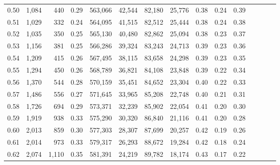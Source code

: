 \begin{tabular}{rrrcrrrrrrrrrrr}
0.50 &   1,084 &    440 &                                       0.29 &  563,066 &   42,544 &   82,180 &   25,776 &  0.38 &  0.24 &                         0.39 \\
0.51 &   1,029 &    332 &                                       0.24 &  564,095 &   41,515 &   82,512 &   25,444 &  0.38 &  0.24 &                         0.38 \\
0.52 &   1,035 &    350 &                                       0.25 &  565,130 &   40,480 &   82,862 &   25,094 &  0.38 &  0.23 &                         0.37 \\
0.53 &   1,156 &    381 &                                       0.25 &  566,286 &   39,324 &   83,243 &   24,713 &  0.39 &  0.23 &                         0.36 \\
0.54 &   1,209 &    415 &                                       0.26 &  567,495 &   38,115 &   83,658 &   24,298 &  0.39 &  0.23 &                         0.35 \\
0.55 &   1,294 &    450 &                                       0.26 &  568,789 &   36,821 &   84,108 &   23,848 &  0.39 &  0.22 &                         0.34 \\
0.56 &   1,370 &    544 &                                       0.28 &  570,159 &   35,451 &   84,652 &   23,304 &  0.40 &  0.22 &                         0.33 \\
0.57 &   1,486 &    556 &                                       0.27 &  571,645 &   33,965 &   85,208 &   22,748 &  0.40 &  0.21 &                         0.31 \\
0.58 &   1,726 &    694 &                                       0.29 &  573,371 &   32,239 &   85,902 &   22,054 &  0.41 &  0.20 &                         0.30 \\
0.59 &   1,919 &    938 &                                       0.33 &  575,290 &   30,320 &   86,840 &   21,116 &  0.41 &  0.20 &                         0.28 \\
0.60 &   2,013 &    859 &                                       0.30 &  577,303 &   28,307 &   87,699 &   20,257 &  0.42 &  0.19 &                         0.26 \\
0.61 &   2,014 &    973 &                                       0.33 &  579,317 &   26,293 &   88,672 &   19,284 &  0.42 &  0.18 &                         0.24 \\
0.62 &   2,074 &  1,110 &                                       0.35 &  581,391 &   24,219 &   89,782 &   18,174 &  0.43 &  0.17 &                         0.22 \\

\end{tabular}
